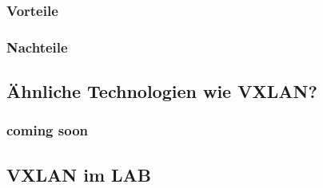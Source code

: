 \documentclass[a4,12pt]{scrartcl}
\begin{document}
\subsubsection{Vorteile}

\subsubsection{Nachteile}

\subsection{Ähnliche Technologien wie VXLAN?}

\subsubsection{coming soon}

\subsection{VXLAN im LAB}
\end{document}

